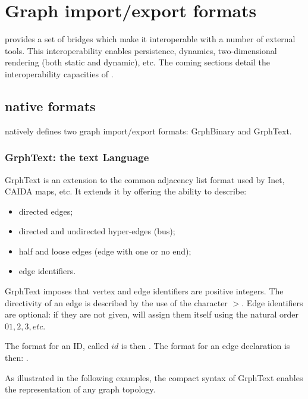 \documentclass{article}
\begin{document}
\section{Graph import/export formats}

	\grph provides a set of bridges which make it interoperable 
	with a number of external tools. This interoperability enables persistence,
	dynamics, two-dimensional rendering (both static
	and dynamic), etc. The coming sections detail the interoperability
	capacities of \grph.



\subsection{\grph native formats}

\grph natively defines two graph import/export formats: GrphBinary and GrphText. 

\subsubsection{GrphText: the text \grph Language}

GrphText is an extension to the common adjacency list  format used by Inet, CAIDA maps, etc.
It extends it by offering the ability to describe:
\begin{itemize}
  \item directed edges;
  \item directed and undirected hyper-edges (bus);
  \item half and loose edges (edge with one or no end);
  \item edge identifiers.
\end{itemize}

GrphText imposes that vertex and edge identifiers are positive integers.
The directivity of an edge is described by the use of the character $>$.
Edge identifiers are optional: if they are not given, \grph will assign them itself
using the natural order $0 1, 2, 3, etc$.

The format for an ID, called $id$ is then \code{[0-9]+}. The format for an edge declaration is
then: .

As illustrated in the following examples, the compact syntax of GrphText enables the representation of any graph topology.
\end{document}

